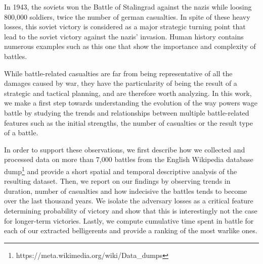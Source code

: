 In 1943, the soviets won the Battle of Stalingrad against the nazis while loosing 800,000 soldiers, twice the number of german casualties. In spite of these heavy losses, this soviet victory is considered as a major strategic turning point that lead to the soviet victory against the nazis' invasion. Human history contains numerous examples such as this one that show the importance and complexity of battles.

While battle-related casualties are far from being representative of all the damages caused by war, they have the particularity of being the result of a strategic and tactical planning, and are therefore worth analyzing. In this work, we make a first step towards understanding the evolution of the way powers wage battle by studying the trends and relationships between multiple battle-related features such as the initial strengths, the number of casualties or the result type of a battle. 

In order to support these observations, we first describe how we collected and processed data on more than 7,000 battles from the English Wikipedia database dump\footnote{https://meta.wikimedia.org/wiki/Data\_dumps} and provide a short spatial and temporal descriptive analysis of the resulting dataset. Then, we report on our findings by observing trends in duration, number of casualties and how indecisive the battles tends to become over the last thousand years. We isolate the adversary losses as a critical feature determining probability of victory and show that this is interestingly not the case for longer-term victories. Lastly, we compute cumulative time spent in battle for each of our extracted belligerents and provide a ranking of the most warlike ones.  
